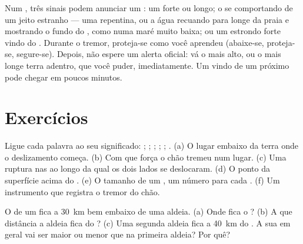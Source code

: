 \begin{remark}\label{rem:g7:earthquakes:natural-warning}
Num , três sinais podem anunciar um : um  forte ou
longo; o  se comportando de um jeito estranho --- uma 
repentina, ou a água recuando para longe da praia e mostrando o fundo do
, como numa maré muito baixa; ou um estrondo forte vindo do .
Durante o tremor, proteja-se como você aprendeu (abaixe-se, proteja-se,
segure-se). Depois, não espere um alerta oficial: vá o mais alto, ou o
mais longe terra adentro, que você puder, imediatamente. Um  vindo
de um  próximo pode chegar em poucos minutos.
\end{remark}


\section{Exercícios}

\begin{exercise}[$\star$]\label{exo:g7:earthquakes:1}
Ligue cada palavra ao seu significado: ; ; ;
; ; . (a) O lugar embaixo da terra onde o
deslizamento começa. (b) Com que força o chão tremeu num lugar. (c) Uma
ruptura nas  ao longo da qual os dois lados se deslocaram. (d) O
ponto da superfície acima do . (e) O tamanho de um , um
número para cada . (f) Um instrumento que registra o tremor do
chão.
\end{exercise}

\begin{exercise}[$\star$]\label{exo:g7:earthquakes:2}
O  de um  fica a \qty{30}{km} bem embaixo de uma aldeia.
(a) Onde fica o ? (b) A que distância a aldeia fica do ?
(c) Uma segunda aldeia fica a \qty{40}{km} do . A sua
 em geral vai ser maior ou menor que na primeira aldeia? Por
quê?
\end{exercise}

